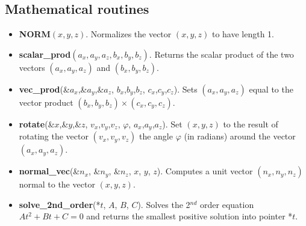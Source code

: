 \subsection{Mathematical routines}
\begin{itemize}
\item \textbf{NORM}$(x,y,z)$. Normalizes the vector $(x,y,z)$ to have
  length 1.
\item \textbf{scalar\_prod}$(a_x,a_y,a_z, b_x,b_y,b_z)$. Returns the scalar
  product of the two vectors $(a_x,a_y,a_z)$ and $(b_x,b_y,b_z)$.
\item \textbf{vec\_prod}(\&$a_x$,\&$a_y$,\&$a_z$, $b_x$,$b_y$,$b_z$, $c_x$,$c_y$,$c_z$). Sets
  $(a_x,a_y,a_z)$ equal to the vector product $(b_x,b_y,b_z) \times (c_x,c_y,c_z)$.
\item \textbf{rotate}(\&$x$,\&$y$,\&$z$, $v_x$,$v_y$,$v_z$, $\varphi$, $a_x$,$a_y$,$a_z$). Set
  $(x,y,z)$ to the result of rotating the vector $(v_x,v_y,v_z)$
  the angle $\varphi$ (in radians) around the vector $(a_x,a_y,a_z)$.
\item \textbf{normal\_vec}(\&$n_x$, \&$n_y$, \&$n_z$, $x$, $y$, $z$).
  Computes a unit vector $(n_x, n_y, n_z)$ normal to the vector
  $(x,y,z)$.
\item \textbf{solve\_2nd\_order}(*$t$, $A$,  $B$,  $C$).
  Solves the 2$^{nd}$ order equation $At^2 + Bt + C = 0$ and returns
  the smallest positive solution into pointer *$t$.
\end{itemize}

